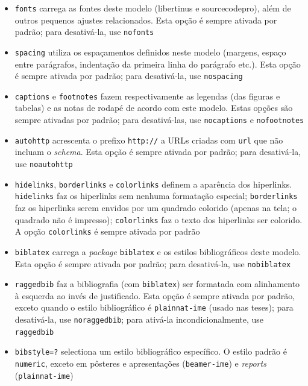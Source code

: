 \begin{itemize}
  \item \texttt{fonts} carrega as fontes deste modelo (libertinus e
        sourcecodepro), além de outros pequenos ajustes relacionados.
        Esta opção é sempre ativada por padrão; para desativá-la, use
        \texttt{nofonts}

  \item \texttt{spacing} utiliza os espaçamentos definidos neste modelo (margens,
        espaço entre parágrafos, indentação da primeira linha do parágrafo
        etc.). Esta opção é sempre ativada por padrão; para desativá-la, use
        \texttt{nospacing}

  \item \texttt{captions} e \texttt{footnotes} fazem respectivamente as legendas
        (das figuras e tabelas) e as notas de rodapé de acordo com este modelo.
        Estas opções são sempre ativadas por padrão; para desativá-las, use
        \texttt{nocaptions} e \texttt{nofootnotes}

  \item \texttt{autohttp} acrescenta o prefixo \texttt{http://} a URLs criadas
        com \texttt{url} que não incluam o \textit{schema}. Esta opção é
        sempre ativada por padrão; para desativá-la, use \texttt{noautohttp}

  \item \texttt{hidelinks}, \texttt{borderlinks} e \texttt{colorlinks} definem a
        aparência dos hiperlinks. \texttt{hidelinks} faz os hiperlinks sem
        nenhuma formatação especial; \texttt{borderlinks} faz os hiperlinks
        serem envidos por um quadrado colorido (apenas na tela; o quadrado
        não é impresso); \texttt{colorlinks} faz o texto dos hiperlinks ser
        colorido. A opção \texttt{colorlinks} é sempre ativada por padrão

  \item \texttt{biblatex} carrega a \textit{package} \texttt{biblatex} e os
        estilos bibliográficos deste modelo. Esta opção é sempre ativada
        por padrão; para desativá-la, use \texttt{nobiblatex}
  \item \texttt{raggedbib} faz a bibliografia (com \texttt{biblatex}) ser
        formatada com alinhamento à esquerda ao invés de justificado.
        Esta opção é sempre ativada por padrão, exceto quando o estilo
        bibliográfico é \texttt{plainnat-ime} (usado nas teses); para
        desativá-la, use \texttt{noraggedbib}; para ativá-la incondicionalmente,
        use \texttt{raggedbib}
  \item \texttt{bibstyle=?} selectiona um estilo bibliográfico específico.
        O estilo padrão é \texttt{numeric}, exceto em pôsteres e apresentações
        (\texttt{beamer-ime}) e \textit{reports} (\texttt{plainnat-ime})


\end{itemize}
